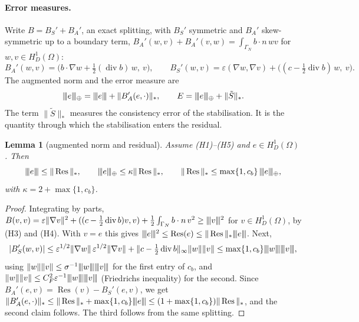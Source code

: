 \documentclass[11pt]{article}
\newcommand{\tnorm}[1]{\lvert\kern-0.25ex\lvert\kern-0.25ex\lvert #1\rvert\kern-0.25ex\rvert\kern-0.25ex\rvert}
\newcommand{\eps}{\varepsilon}
\newcommand{\Res}{\operatorname{Res}}
\newcommand{\Stil}{\tilde S}
\newcommand{\dv}{\operatorname{div}}
\theoremstyle{plain}
\newtheorem{lemma}[theorem]{Lemma}
\theoremstyle{remark}
\numberwithin{equation}{section}
\begin{document}
\paragraph{Error measures.} Write $B=B_S'+B_A'$, an exact splitting, with $B_S'$ symmetric and $B_A'$
skew-symmetric up to a boundary term, $B_A'(w,v)+B_A'(v,w)=\int_{\Gamma_N}b\cdot n\,wv$ for
$w,v\in H^1_D(\Omega)$:
\[
  B_A'(w,v) = \bigl(b\cdot\nabla w+\tfrac12(\dv b)\,w,\ v\bigr),\qquad
  B_S'(w,v) = \eps(\nabla w,\nabla v)+\bigl((c-\tfrac12\dv b)\,w,\ v\bigr).
\]
The augmented norm and the error measure are
\[
  \tnorm{e}_\oplus = \tnorm{e}+\|B_A'(e,\cdot)\|_*,\qquad E=\tnorm{e}_\oplus+\|\Stil\|_*.
\]
The term $\|\Stil\|_*$ measures the consistency error of the stabilisation. It is the quantity
through which the stabilisation enters the residual.

\begin{lemma}[augmented norm and residual]\label{lem:kappa}
Assume (H1)--(H5) and $e\in H^1_D(\Omega)$. Then
\[
  \tnorm{e}\le\|\Res\|_*,\qquad
  \tnorm{e}_\oplus\le\kappa\|\Res\|_*,\qquad
  \|\Res\|_*\le\max\{1,c_b\}\,\tnorm{e}_\oplus,
\]
with $\kappa=2+\max\{1,c_b\}$.
\end{lemma}

\begin{proof}
Integrating by parts,
$B(v,v)=\eps\|\nabla v\|^2+((c-\frac12\dv b)v,v)+\frac12\int_{\Gamma_N}b\cdot n\,v^2\ge\tnorm{v}^2$ for
$v\in H^1_D(\Omega)$, by (H3) and (H4). With $v=e$ this gives
$\tnorm{e}^2\le\Res(e)\le\|\Res\|_*\tnorm{e}$. Next,
\[
  |B_S'(w,v)|\le \eps^{1/2}\|\nabla w\|\,\eps^{1/2}\|\nabla v\|
  +\|c-\tfrac12\dv b\|_\infty\|w\|\|v\|\le\max\{1,c_b\}\tnorm{w}\tnorm{v},
\]
using $\|w\|\|v\|\le\sigma^{-1}\tnorm{w}\tnorm{v}$ for the first entry of $c_b$, and
$\|w\|\|v\|\le C_F^2\eps^{-1}\tnorm{w}\tnorm{v}$ (Friedrichs inequality) for the second. Since
$B_A'(e,v)=\Res(v)-B_S'(e,v)$, we get
$\|B_A'(e,\cdot)\|_*\le\|\Res\|_*+\max\{1,c_b\}\tnorm{e}\le(1+\max\{1,c_b\})\|\Res\|_*$, and the
second claim follows. The third follows from the same splitting.
\end{proof}
\end{document}
